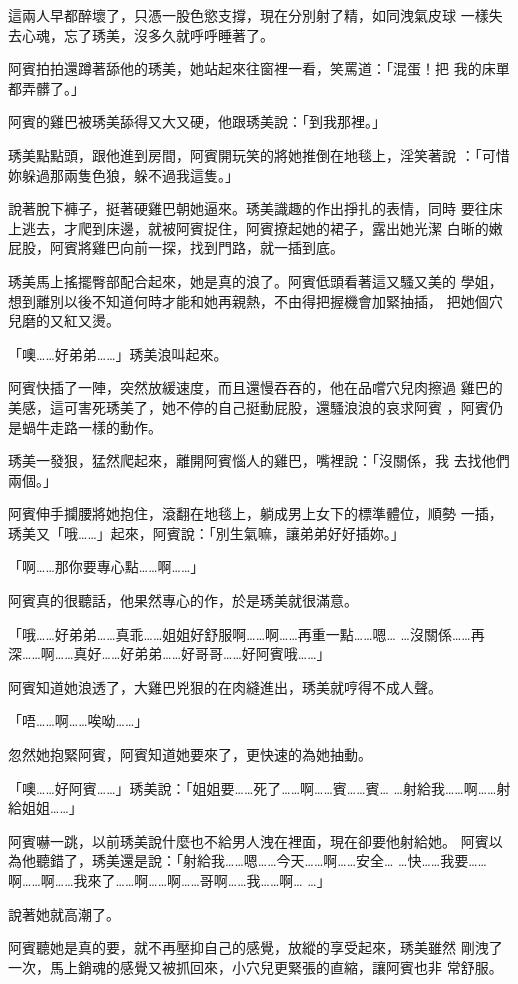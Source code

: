 這兩人早都醉壞了，只憑一股色慾支撐，現在分別射了精，如同洩氣皮球
一樣失去心魂，忘了琇美，沒多久就呼呼睡著了。

阿賓拍拍還蹲著舔他的琇美，她站起來往窗裡一看，笑罵道：「混蛋！把
我的床單都弄髒了。」

阿賓的雞巴被琇美舔得又大又硬，他跟琇美說：「到我那裡。」

琇美點點頭，跟他進到房間，阿賓開玩笑的將她推倒在地毯上，淫笑著說
：「可惜妳躲過那兩隻色狼，躲不過我這隻。」

說著脫下褲子，挺著硬雞巴朝她逼來。琇美識趣的作出掙扎的表情，同時
要往床上逃去，才爬到床邊，就被阿賓捉住，阿賓撩起她的裙子，露出她光潔
白晰的嫩屁股，阿賓將雞巴向前一探，找到門路，就一插到底。

琇美馬上搖擺臀部配合起來，她是真的浪了。阿賓低頭看著這又騷又美的
學姐，想到離別以後不知道何時才能和她再親熱，不由得把握機會加緊抽插，
把她個穴兒磨的又紅又燙。

「噢……好弟弟……」琇美浪叫起來。

阿賓快插了一陣，突然放緩速度，而且還慢吞吞的，他在品嚐穴兒肉擦過
雞巴的美感，這可害死琇美了，她不停的自己挺動屁股，還騷浪浪的哀求阿賓
，阿賓仍是蝸牛走路一樣的動作。

琇美一發狠，猛然爬起來，離開阿賓惱人的雞巴，嘴裡說：「沒關係，我
去找他們兩個。」

阿賓伸手攔腰將她抱住，滾翻在地毯上，躺成男上女下的標準體位，順勢
一插，琇美又「哦……」起來，阿賓說：「別生氣嘛，讓弟弟好好插妳。」

「啊……那你要專心點……啊……」

阿賓真的很聽話，他果然專心的作，於是琇美就很滿意。

「哦……好弟弟……真乖……姐姐好舒服啊……啊……再重一點……嗯…
…沒關係……再深……啊……真好……好弟弟……好哥哥……好阿賓哦……」

阿賓知道她浪透了，大雞巴兇狠的在肉縫進出，琇美就哼得不成人聲。

「唔……啊……唉呦……」

忽然她抱緊阿賓，阿賓知道她要來了，更快速的為她抽動。

「噢……好阿賓……」琇美說：「姐姐要……死了……啊……賓……賓…
…射給我……啊……射給姐姐……」

阿賓嚇一跳，以前琇美說什麼也不給男人洩在裡面，現在卻要他射給她。
阿賓以為他聽錯了，琇美還是說：「射給我……嗯……今天……啊……安全…
…快……我要……啊……啊……我來了……啊……啊……哥啊……我……啊…
…」

說著她就高潮了。

阿賓聽她是真的要，就不再壓抑自己的感覺，放縱的享受起來，琇美雖然
剛洩了一次，馬上銷魂的感覺又被抓回來，小穴兒更緊張的直縮，讓阿賓也非
常舒服。

